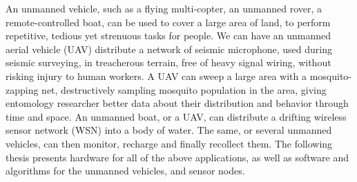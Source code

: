 

An unmanned vehicle, such as a flying multi-copter, an unmanned rover, a remote-controlled boat, can be used to cover a large area of land, to perform repetitive, tedious yet strenuous tasks for people.
We can have an unmanned aerial vehicle (UAV) distribute a network of seismic microphone, used during seismic surveying, in treacherous terrain, free of heavy signal wiring, without risking injury to human workers.
A UAV can sweep a large area with a mosquito-zapping net, destructively sampling mosquito population in the area, giving entomology researcher better data about their distribution and behavior through time and space.
An unmanned boat, or a UAV, can distribute a drifting wireless sensor network (WSN) into a body of water.
The same, or several unmanned vehicles, can then monitor, recharge and finally recollect them.
The following thesis presents hardware for all of the above applications, as well as software and algorithms for the unmanned vehicles, and sensor nodes.
